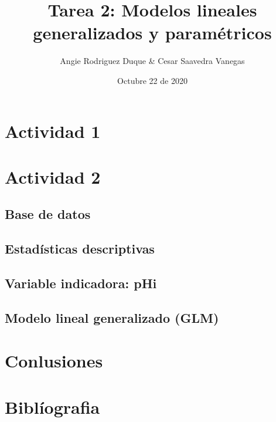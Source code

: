\documentclass[
]{article}
\title{Tarea 2: Modelos lineales generalizados y paramétricos}
\author{Angie Rodriguez Duque \& Cesar Saavedra Vanegas}
\date{Octubre 22 de 2020}
\begin{document}
\maketitle

\hypertarget{actividad-1}{%
\section{Actividad 1}\label{actividad-1}}

\hypertarget{section}{%
\subsection{}\label{section}}

\hypertarget{actividad-2}{%
\section{Actividad 2}\label{actividad-2}}

\hypertarget{base-de-datos}{%
\subsection{Base de datos}\label{base-de-datos}}

\hypertarget{estaduxedsticas-descriptivas}{%
\subsection{Estadísticas
descriptivas}\label{estaduxedsticas-descriptivas}}

\hypertarget{variable-indicadora-phi}{%
\subsection{Variable indicadora: pHi}\label{variable-indicadora-phi}}

\hypertarget{modelo-lineal-generalizado-glm}{%
\subsection{Modelo lineal generalizado
(GLM)}\label{modelo-lineal-generalizado-glm}}

\hypertarget{conlusiones}{%
\section{Conlusiones}\label{conlusiones}}

\hypertarget{bibluxedografia}{%
\section{Biblíografia}\label{bibluxedografia}}
\end{document}
